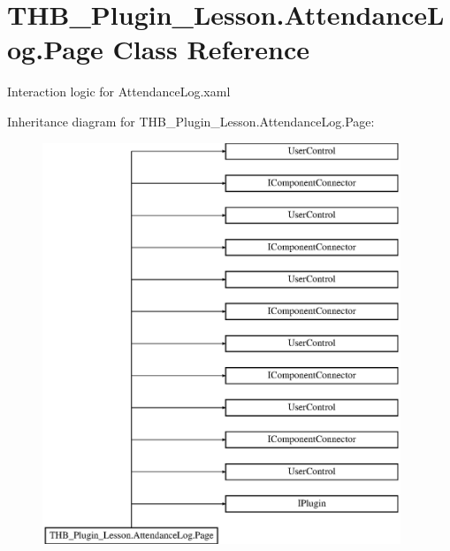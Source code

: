 \hypertarget{class_t_h_b___plugin___lesson_1_1_attendance_log_1_1_page}{}\section{T\+H\+B\+\_\+\+Plugin\+\_\+\+Lesson.\+Attendance\+Log.\+Page Class Reference}
\label{class_t_h_b___plugin___lesson_1_1_attendance_log_1_1_page}


Interaction logic for Attendance\+Log.\+xaml  


Inheritance diagram for T\+H\+B\+\_\+\+Plugin\+\_\+\+Lesson.\+Attendance\+Log.\+Page\+:\begin{figure}[H]
\begin{center}
\leavevmode
\includegraphics[height=12.000000cm]{d9/d5f/class_t_h_b___plugin___lesson_1_1_attendance_log_1_1_page}
\end{center}
\end{figure}
